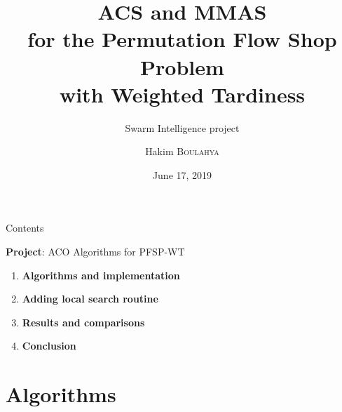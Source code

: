 \documentclass[10pt]{beamer}
\title{ACS and MMAS \\ for the Permutation Flow Shop Problem \\ with Weighted Tardiness}
\subtitle{Swarm Intelligence project}
\date{June 17, 2019}
\author{
  Hakim \textsc{Boulahya}
}
\institute[
  Faculty of Science
  Université Libre de Bruxelles
  Belgium
] %
{%

  Département d'Informatique \\
  Université Libre de Bruxelles \\
}
\begin{document}
{\aauwavesbg%
\begin{frame} %
  \titlepage
\end{frame}}

\begin{frame}{Contents}{}

\begin{block}{}
  \textbf{Project}: ACO Algorithms for PFSP-WT
  \begin{enumerate}
    \item \textcolor{firstcolor}{\textbf{Algorithms and implementation}}
    \item \textcolor{firstcolor}{\textbf{Adding local search routine}}
     \item \textcolor{firstcolor}{\textbf{Results and comparisons}}
    \item \textcolor{firstcolor}{\textbf{Conclusion}}
  \end{enumerate}
\end{block}

\end{frame}

\section{Algorithms}
\end{document}

